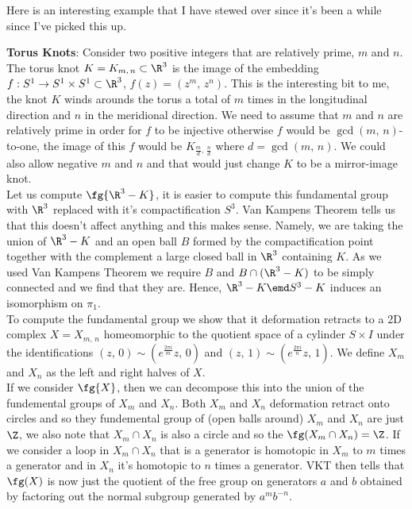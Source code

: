 Here is an interesting example that I have stewed over since it's been a while since I've picked this up.
\begin{eg}
  \textbf{Torus Knots}: Consider two positive integers that are relatively prime, $m$ and $n$. The torus knot $K = K_{m,\,n} \subset \R^3$ is the image of the embedding $f : S^1 \to S^1 \times S^1 \subset \R^3$, $f(z) = (z^m,\,z^n)$. This is the interesting bit to me, the knot $K$ winds arounds the torus a total of $m$ times in the longitudinal direction and $n$ in the meridional direction. We need to assume that $m$ and $n$ are relatively prime in order for $f$ to be injective otherwise $f$ would be $\gcd(m,\,n)$-to-one, the image of this $f$ would be $K_{\frac{m}{d},\,\frac{n}{d}}$ where $d = \gcd(m,\,n)$. We could also allow negative $m$ and $n$ and that would just change $K$ to be a mirror-image knot.\\
  Let us compute $\fg{\R^3 - K}$, it is easier to compute this fundamental group with $\R^3$ replaced with it's compactification $S^3$. Van Kampens Theorem tells us that this doesn't affect anything and this makes sense. Namely, we are taking the union of $\R^3 - K$ and an open ball $B$ formed by the compactification point together with the complement a large closed ball in $\R^3$ containing $K$. As we used Van Kampens Theorem we require $B$ and $B\cap (\R^3 - K)$ to be simply connected and we find that they are. Hence, $\R^3 - K \emd S^3 - K$ induces an isomorphism on $\pi_1$.\\
  To compute the fundamental group we show that it deformation retracts to a 2D complex $X = X_{m,\,n}$ homeomorphic to the quotient space of a cylinder $S \times I$ under the identifications $(z,\,0) \sim (e^{\frac{2\pi i}{m}}z,\,0)$ and $(z,\,1) \sim (e^{\frac{2\pi i}{n}}z,\,1)$. We define $X_m$ and $X_n$ as the left and right halves of $X$.\\
  If we consider $\fg{X}$, then we can decompose this into the union of the fundemental groups of $X_m$ and $X_n$. Both $X_m$ and $X_n$ deformation retract onto circles and so they fundemental group of (open balls around) $X_m$ and $X_n$ are just $\Z$, we also note that $X_m \cap X_n$ is also a circle and so the $\fg(X_m \cap X_n) = \Z$. If we consider a loop in $X_m \cap X_n$ that is a generator is homotopic in $X_m$ to $m$ times a generator and in $X_n$ it's homotopic to $n$ times a generator. VKT then tells that $\fg(X)$ is now just the quotient of the free group on generators $a$ and $b$ obtained by factoring out the normal subgroup generated by $a^mb^{-n}$. \\


\end{eg}
